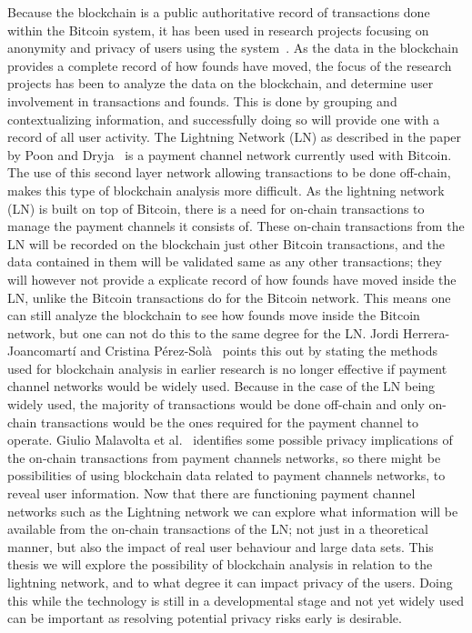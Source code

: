Because the blockchain is a public authoritative record of transactions done within the Bitcoin system, it has been used in research projects focusing on anonymity and privacy of users using the system~\cite{reid2013analysis,meiklejohn2013fistful}. As the data in the blockchain provides a complete record of how founds have moved, the focus of the research projects has been to analyze the data on the blockchain, and determine user involvement in transactions and founds. This is done by grouping and contextualizing information, and successfully doing so will provide one with a record of all user activity. 
The Lightning Network (LN) as described in the paper by Poon and Dryja~\cite{poon2015bitcoin} is a payment channel network currently used with Bitcoin. The use of this second layer network allowing transactions to be done off-chain, makes this type of blockchain analysis more difficult. As the lightning network (LN) is built on top of Bitcoin, there is a need for on-chain transactions to manage the payment channels it consists of. These on-chain transactions from the LN will be recorded on the blockchain just other Bitcoin transactions, and the data contained in them will be validated same as any other transactions; they will however not provide a explicate record of how founds have moved inside the LN, unlike the Bitcoin transactions do for the Bitcoin network.
This means one can still analyze the blockchain to see how founds move inside the Bitcoin network, but one can not do this to the same degree for the LN. Jordi Herrera-Joancomartí and Cristina Pérez-Solà~\cite{herrera2015research} points this out by stating the methods used for blockchain analysis in earlier research is no longer effective if payment channel networks would be widely used. Because in the case of the LN being widely used, the majority of transactions would be done off-chain and only on-chain transactions would be the ones required for the payment channel to operate. Giulio Malavolta et al.~\cite{malavolta2017concurrency} identifies some possible privacy implications of the on-chain transactions from payment channels networks, so there might be possibilities of using blockchain data related to payment channels networks, to reveal user information. Now that there are functioning payment channel networks such as the Lightning network we can explore what information will be available from the on-chain transactions of the LN; not just in a theoretical manner, but also the impact of real user behaviour and large data sets. This thesis we will explore the possibility of blockchain analysis in relation to the lightning network, and to what degree it can impact privacy of the users. Doing this while the technology is still in a developmental stage and not yet widely used can be important as resolving potential privacy risks early is desirable.
\\

